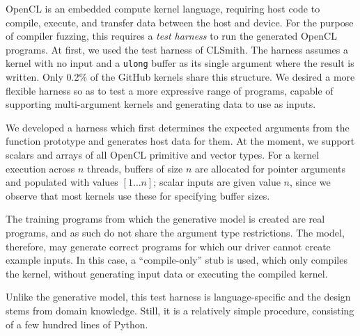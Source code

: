 OpenCL is an embedded compute kernel language, requiring host code to compile,
execute, and transfer data between the host and device. For the purpose of
compiler fuzzing, this requires a \emph{test harness} to run the generated
OpenCL programs. At first, we used the test harness of CLSmith. The harness
assumes a kernel with no input and a \texttt{ulong} buffer as its single
argument where the result is written. Only 0.2\% of the GitHub kernels share
this structure. We desired a more flexible harness so as to test a more
expressive range of programs, capable of supporting multi-argument kernels and
generating data to use as inputs.

We developed a harness which first determines the expected arguments from the
function prototype and generates host data for them. At the moment, we support
scalars and arrays of all OpenCL primitive and vector types. For a kernel
execution across $n$ threads, buffers of size $n$ are allocated for pointer
arguments and populated with values {$[1 \ldots n]$}; scalar inputs are given
value $n$, since we observe that most kernels use these for specifying buffer
sizes.

The training programs from which the generative model is created are real
programs, and as such do not share the argument type restrictions. The model,
therefore, may generate correct programs for which our driver cannot create
example inputs. In this case, a ``compile-only'' stub is used, which only
compiles the kernel, without generating input data or executing the compiled
kernel.

Unlike the generative model, this test harness is language-specific and the
design stems from domain knowledge. Still, it is a relatively simple procedure,
consisting of a few hundred lines of Python.

